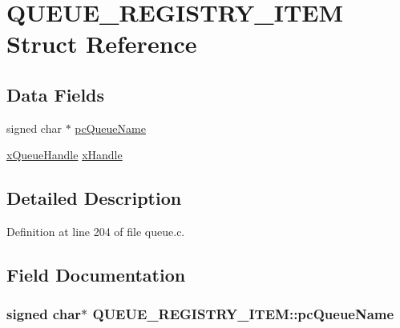 \hypertarget{struct_q_u_e_u_e___r_e_g_i_s_t_r_y___i_t_e_m}{\section{Q\-U\-E\-U\-E\-\_\-\-R\-E\-G\-I\-S\-T\-R\-Y\-\_\-\-I\-T\-E\-M Struct Reference}
\label{struct_q_u_e_u_e___r_e_g_i_s_t_r_y___i_t_e_m}
}
\subsection*{Data Fields}
\begin{DoxyCompactItemize}
\item 
signed char $\ast$ \hyperlink{struct_q_u_e_u_e___r_e_g_i_s_t_r_y___i_t_e_m_a09ca510911c40fa2d2be53744b4c410d}{pc\-Queue\-Name}
\item 
\hyperlink{_common_2_libraries_2_free_r_t_o_s_2_source_2include_2queue_8h_a229037f755b756156e34a440ce134b8b}{x\-Queue\-Handle} \hyperlink{struct_q_u_e_u_e___r_e_g_i_s_t_r_y___i_t_e_m_a48364674fcd66dd86aa68ffa50186e48}{x\-Handle}
\end{DoxyCompactItemize}


\subsection{Detailed Description}


Definition at line 204 of file queue.\-c.



\subsection{Field Documentation}
\hypertarget{struct_q_u_e_u_e___r_e_g_i_s_t_r_y___i_t_e_m_a09ca510911c40fa2d2be53744b4c410d}{
\subsubsection[{pc\-Queue\-Name}]{\setlength{\rightskip}{0pt plus 5cm}signed char$\ast$ Q\-U\-E\-U\-E\-\_\-\-R\-E\-G\-I\-S\-T\-R\-Y\-\_\-\-I\-T\-E\-M\-::pc\-Queue\-Name}}\label{struct_q_u_e_u_e___r_e_g_i_s_t_r_y___i_t_e_m_a09ca510911c40fa2d2be53744b4c410d}


